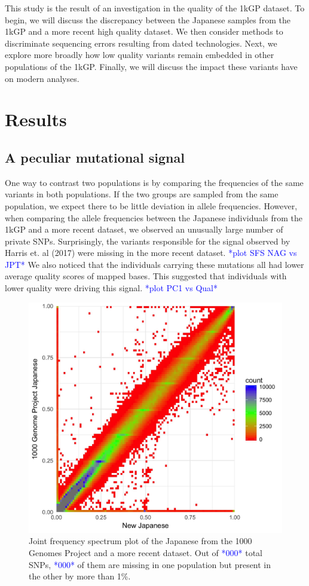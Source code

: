 \documentclass[12pt,twocolumn]{article}
\newcommand{\todo}[1]{\textcolor{blue}{*#1*}}
\begin{document}
This study is the result of an investigation in the quality of the 1kGP dataset.
To begin, we will discuss the discrepancy between the Japanese samples from the 1kGP and a more recent high quality dataset. 
We then consider methods to discriminate sequencing errors resulting from dated technologies.
Next, we explore more broadly how low quality variants remain embedded in other populations of the 1kGP.
Finally, we will discuss the impact these variants have on modern analyses.

			\section{Results}
	\subsection{A peculiar mutational signal}			
One way to contrast two populations is by comparing the frequencies of the same variants in both populations.
If the two groups are sampled from the same population, we expect there to be little deviation in allele frequencies.
However, when comparing the allele frequencies between the Japanese individuals from the 1kGP and a more recent dataset, we observed an unusually large number of private SNPs.
Surprisingly, the variants responsible for the signal observed by Harris et. al (2017) were missing in the more recent dataset. 
\todo{plot SFS NAG vs JPT}
We also noticed that the individuals carrying these mutations all had lower average quality scores of mapped bases.
This suggested that individuals with lower quality were driving this signal.
\todo{plot PC1 vs Qual}

\begin{figure}
\includegraphics[width=\hsize,keepaspectratio]{NAG_JPT_SFS_GenomeWide.jpg}
\caption{Joint frequency spectrum plot of the Japanese from the 1000 Genomes Project and a more recent dataset. Out of \todo{000} total SNPs, \todo{000} of them are missing in one population but present in the other by more than 1\%.}
 \label{SFS}
\end{figure}
\end{document}
